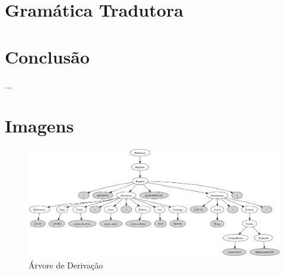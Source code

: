 \documentclass[a4paper,11pt,openright,openbib]{article}
\begin{document}
\section{Gramática Tradutora} %
\label{sec:gram_tica_tradutora}





\section{Conclusão}
... %


\newpage
\appendix
\section{Imagens}
\label{ap:imagens}
\begin{figure}[!htb]
	\begin{center}
		\includegraphics[scale=.33,angle=-90,keepaspectratio]{../ficha5/g.png}
	\end{center}
	\caption{\label{parse_tree_ap}Árvore de Derivação}
\end{figure}
\end{document}
